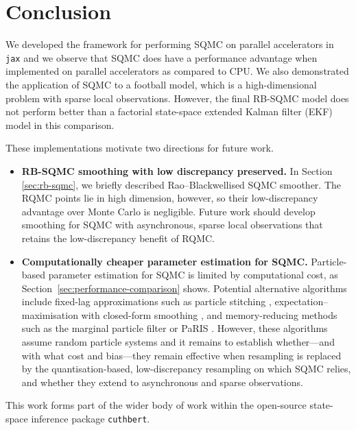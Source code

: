 \chapter{Conclusion}
We developed the framework for performing SQMC on parallel accelerators in \texttt{jax} and we observe that SQMC does have a performance advantage when implemented on parallel accelerators as compared to CPU. We also demonstrated the application of SQMC to a football model, which is a high-dimensional problem with sparse local observations. However, the final RB-SQMC model does not perform better than a factorial state-space extended Kalman filter (EKF) model in this comparison. 

These implementations motivate two directions for future work.

\begin{itemize}
\item \textbf{RB-SQMC smoothing with low discrepancy preserved.} In Section \ref{sec:rb-sqmc}, we briefly described Rao--Blackwellised SQMC smoother. The RQMC points lie in high dimension, however, so their low-discrepancy advantage over Monte Carlo is negligible. Future work should develop smoothing for SQMC with asynchronous, sparse local observations that retains the low-discrepancy benefit of RQMC.

\item \textbf{Computationally cheaper parameter estimation for SQMC.} Particle-based parameter estimation for SQMC is limited by computational cost, as Section~\ref{sec:performance-comparison} shows. Potential alternative algorithms include fixed-lag approximations such as particle stitching \citep{duffieldsingh2022onlinesmoothing}, expectation--maximisation with closed-form smoothing \citep{duffieldpowerrimella2024factorialssm}, and memory-reducing methods such as the marginal particle filter \citep{klaasdefreitasdoucet2005marginalpf} or PaRIS \citep{olssonwesterborn2017paris}. However, these algorithms assume random particle systems and it remains to establish whether---and with what cost and bias---they remain effective when resampling is replaced by the quantisation-based, low-discrepancy resampling on which SQMC relies, and whether they extend to asynchronous and sparse observations.
\end{itemize}

This work forms part of the wider body of work within the open-source state-space inference package \texttt{cuthbert}.




